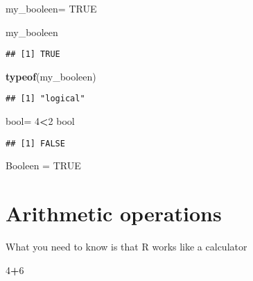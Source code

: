 \documentclass[
]{article}
\newenvironment{Shaded}{\begin{snugshade}}{\end{snugshade}}
\newcommand{\ConstantTok}[1]{\textcolor[rgb]{0.56,0.35,0.01}{#1}}
\newcommand{\DecValTok}[1]{\textcolor[rgb]{0.00,0.00,0.81}{#1}}
\newcommand{\FunctionTok}[1]{\textcolor[rgb]{0.13,0.29,0.53}{\textbf{#1}}}
\newcommand{\NormalTok}[1]{#1}
\newcommand{\OtherTok}[1]{\textcolor[rgb]{0.56,0.35,0.01}{#1}}
\newcommand{\SpecialCharTok}[1]{\textcolor[rgb]{0.81,0.36,0.00}{\textbf{#1}}}
\begin{document}
\begin{Shaded}
\begin{Highlighting}[]
\NormalTok{my\_booleen}\OtherTok{=} \ConstantTok{TRUE}

\NormalTok{my\_booleen}
\end{Highlighting}
\end{Shaded}

\begin{verbatim}
## [1] TRUE
\end{verbatim}

\begin{Shaded}
\begin{Highlighting}[]
\FunctionTok{typeof}\NormalTok{(my\_booleen)}
\end{Highlighting}
\end{Shaded}

\begin{verbatim}
## [1] "logical"
\end{verbatim}

\begin{Shaded}
\begin{Highlighting}[]
\NormalTok{bool}\OtherTok{=} \DecValTok{4}\SpecialCharTok{\textless{}}\DecValTok{2}
\NormalTok{bool}
\end{Highlighting}
\end{Shaded}

\begin{verbatim}
## [1] FALSE
\end{verbatim}

\begin{Shaded}
\begin{Highlighting}[]
\NormalTok{Booleen }\OtherTok{=} \ConstantTok{TRUE}
\end{Highlighting}
\end{Shaded}

\hypertarget{arithmetic-operations}{%
\section{Arithmetic operations}\label{arithmetic-operations}}

What you need to know is that R works like a calculator

\begin{Shaded}
\begin{Highlighting}[]
\DecValTok{4}\SpecialCharTok{+}\DecValTok{6}
\end{Highlighting}
\end{Shaded}
\end{document}
